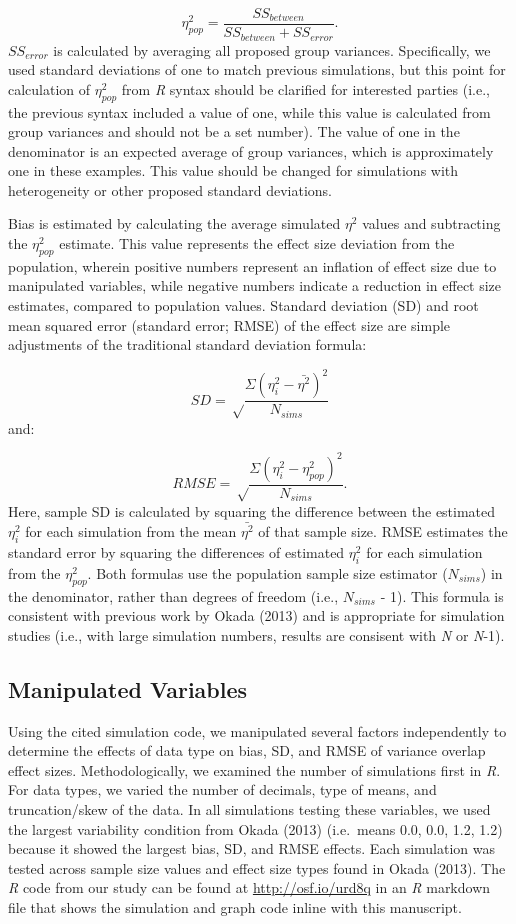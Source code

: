\documentclass[english,man]{apa6}
\theoremstyle{definition}
\theoremstyle{definition}
\theoremstyle{definition}
\theoremstyle{remark}
\begin{document}
\[
\eta^2_{pop} = \frac{SS_{between}} {SS_{between} + SS_{error}}.
\] \(SS_{error}\) is calculated by averaging all proposed group
variances. Specifically, we used standard deviations of one to match
previous simulations, but this point for calculation of \(\eta^2_{pop}\)
from \emph{R} syntax should be clarified for interested parties (i.e.,
the previous syntax included a value of one, while this value is
calculated from group variances and should not be a set number). The
value of one in the denominator is an expected average of group
variances, which is approximately one in these examples. This value
should be changed for simulations with heterogeneity or other proposed
standard deviations.

Bias is estimated by calculating the average simulated \(\eta^2\) values
and subtracting the \(\eta^2_{pop}\) estimate. This value represents the
effect size deviation from the population, wherein positive numbers
represent an inflation of effect size due to manipulated variables,
while negative numbers indicate a reduction in effect size estimates,
compared to population values. Standard deviation (SD) and root mean
squared error (standard error; RMSE) of the effect size are simple
adjustments of the traditional standard deviation formula:

\[
SD = \sqrt\frac{\Sigma (\eta^2_{i} - \bar{\eta^2})^2} {N_{sims}}
\] and:

\[
RMSE = \sqrt\frac{\Sigma (\eta^2_{i} - \eta^2_{pop})^2} {N_{sims}}.
\] Here, sample SD is calculated by squaring the difference between the
estimated \(\eta^2_{i}\) for each simulation from the mean
\(\bar{\eta^2}\) of that sample size. RMSE estimates the standard error
by squaring the differences of estimated \(\eta^2_{i}\) for each
simulation from the \(\eta^2_{pop}\). Both formulas use the population
sample size estimator (\(N_{sims}\)) in the denominator, rather than
degrees of freedom (i.e., \(N_{sims}\) - 1). This formula is consistent
with previous work by Okada (2013) and is appropriate for simulation
studies (i.e., with large simulation numbers, results are consisent with
\emph{N} or \emph{N}-1).

\subsection{Manipulated Variables}\label{manipulated-variables}

Using the cited simulation code, we manipulated several factors
independently to determine the effects of data type on bias, SD, and
RMSE of variance overlap effect sizes. Methodologically, we examined the
number of simulations first in \emph{R}. For data types, we varied the
number of decimals, type of means, and truncation/skew of the data. In
all simulations testing these variables, we used the largest variability
condition from Okada (2013) (i.e.~means 0.0, 0.0, 1.2, 1.2) because it
showed the largest bias, SD, and RMSE effects. Each simulation was
tested across sample size values and effect size types found in Okada
(2013). The \emph{R} code from our study can be found at
\url{http://osf.io/urd8q} in an \emph{R} markdown file that shows the
simulation and graph code inline with this manuscript.
\end{document}
